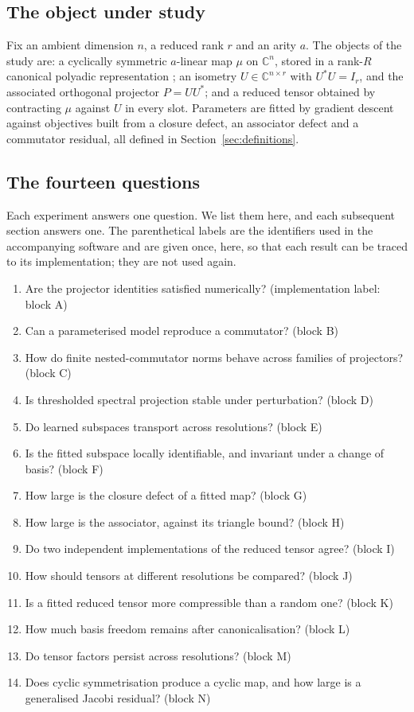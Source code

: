 \documentclass[11pt]{amsart}
\theoremstyle{remark}
\begin{document}
\subsection{The object under study}

Fix an ambient dimension $n$, a reduced rank $r$ and an arity $a$. The objects of the
study are: a cyclically symmetric $a$-linear map $\mu$ on $\mathbb C^{n}$, stored in a
rank-$R$ canonical polyadic representation \cite{KoldaBader2009}; an isometry
$U\in\mathbb C^{n\times r}$ with $U^{*}U=I_r$, and the associated orthogonal projector
$P=UU^{*}$; and a reduced tensor obtained by contracting $\mu$ against $U$ in every slot.
Parameters are fitted by gradient descent against objectives built from a closure defect,
an associator defect and a commutator residual, all defined in
Section~\ref{sec:definitions}.

\subsection{The fourteen questions}

Each experiment answers one question. We list them here, and each subsequent section
answers one. The parenthetical labels are the identifiers used in the accompanying
software \cite{ChaveroJassoSoftware} and are given once, here, so that each result can be
traced to its implementation; they are not used again.

\begin{enumerate}[leftmargin=*,label=(Q\arabic*)]
\item Are the projector identities satisfied numerically? (implementation label: block A)
\item Can a parameterised model reproduce a commutator? (block B)
\item How do finite nested-commutator norms behave across families of projectors? (block C)
\item Is thresholded spectral projection stable under perturbation? (block D)
\item Do learned subspaces transport across resolutions? (block E)
\item Is the fitted subspace locally identifiable, and invariant under a change of basis? (block F)
\item How large is the closure defect of a fitted map? (block G)
\item How large is the associator, against its triangle bound? (block H)
\item Do two independent implementations of the reduced tensor agree? (block I)
\item How should tensors at different resolutions be compared? (block J)
\item Is a fitted reduced tensor more compressible than a random one? (block K)
\item How much basis freedom remains after canonicalisation? (block L)
\item Do tensor factors persist across resolutions? (block M)
\item Does cyclic symmetrisation produce a cyclic map, and how large is a generalised
Jacobi residual? (block N)
\end{enumerate}
\end{document}
